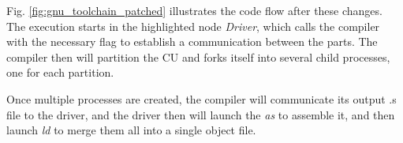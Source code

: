 \documentclass[runningheads]{llncs}
\begin{document}
Fig. \ref{fig:gnu_toolchain_patched} illustrates the code flow after these
changes.  The execution starts in the highlighted node \textit{Driver}, which
calls the compiler with the necessary flag to establish a communication between
the parts. The compiler then will partition the CU and forks
itself into several child processes, one for each partition.

Once multiple processes are created, the compiler will communicate its
output .s file to the driver, and the driver then will launch the \textit{as}
to assemble it, and then launch \textit{ld} to merge them all into a single
object file.

\end{document}
